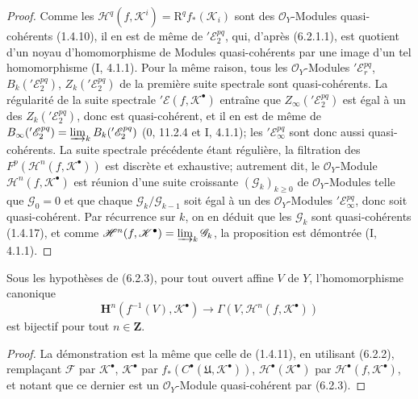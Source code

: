 \begin{proof}
Comme les $\mathscr H^q(f,\mathscr K^i)=\mathrm R^q f_*(\mathscr K_i)$ sont
des $\mathscr O_Y$-Modules quasi-cohérents (1.4.10), il en est de même de
$'\mathscr E_2^{pq}$, qui, d'après (6.2.1.1), est quotient d'un noyau
d'homomorphisme de Modules quasi-cohérents par une image d'un tel
homomorphisme (I, 4.1.1). Pour la même raison, tous les
$\mathscr O_Y$-Modules $'\mathscr E_r^{pq}$,
$B_k('\mathscr E_2^{pq})$, $Z_k('\mathscr E_2^{pq})$ de la première suite
spectrale sont quasi-cohérents. La régularité de la suite spectrale
$'\mathscr E(f,\mathscr K^\bullet)$ entraîne que
$Z_\infty('\mathscr E_2^{pq})$ est égal à un des
$Z_k('\mathscr E_2^{pq})$, donc est quasi-cohérent, et il en est de même de
$B_\infty('\mathscr E_2^{pq})=\varinjlim_k B_k('\mathscr E_2^{pq})$
(0, 11.2.4 et I, 4.1.1); les $'\mathscr E_\infty^{pq}$ sont donc aussi
quasi-cohérents. La suite spectrale précédente étant régulière, la filtration
des $F^p(\mathscr H^n(f,\mathscr K^\bullet))$ est discrète et exhaustive;
autrement dit, le $\mathscr O_Y$-Module
$\mathscr H^n(f,\mathscr K^\bullet)$ est réunion d'une suite croissante
$(\mathscr G_k)_{k\geq0}$ de $\mathscr O_Y$-Modules telle que
$\mathscr G_0=0$ et que chaque $\mathscr G_k/\mathscr G_{k-1}$ soit égal à un
des $\mathscr O_Y$-Modules $'\mathscr E_\infty^{pq}$, donc soit
quasi-cohérent. Par récurrence sur $k$, on en déduit que les $\mathscr G_k$
sont quasi-cohérents (1.4.17), et comme
$\mathscr H^n(f,\mathscr K^\bullet)=\varinjlim_k\mathscr G_k$, la proposition
est démontrée (I, 4.1.1).
\end{proof}


\begin{corollary}[6.2.4]
Sous les hypothèses de (6.2.3), pour tout ouvert affine $V$ de $Y$,
l'homomorphisme canonique
\[
  \mathbf H^n(f^{-1}(V),\mathscr K^\bullet)
  \longrightarrow
  \Gamma(V,\mathscr H^n(f,\mathscr K^\bullet))
  \tag{6.2.4.1}\label{III.6.2.4.1.fr}
\]
est bijectif pour tout $n\in\mathbf Z$.
\end{corollary}

\begin{proof}
La démonstration est la même que celle de (1.4.11), en utilisant (6.2.2),
remplaçant $\mathscr F$ par $\mathscr K^\bullet$,
$\mathscr K^\bullet$ par
$f_*(C^\bullet(\mathfrak U,\mathscr K^\bullet))$,
$\mathscr H^\bullet(\mathscr K^\bullet)$ par
$\mathscr H^\bullet(f,\mathscr K^\bullet)$, et notant que ce dernier est un
$\mathscr O_Y$-Module quasi-cohérent par (6.2.3).
\end{proof}

